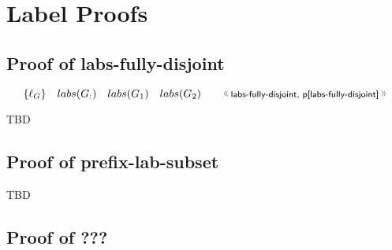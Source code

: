 \section{Label Proofs}\label{sec:label-proofs}

\subsection{Proof of labs-fully-disjoint}

\[
  \setof{\ell_G}
  \quad
  labs(G_{:})
  \quad
  labs(G_1)
  \quad
  labs(G_2)
  \qquad
  \eref{labs-fully-disjoint}
\]

TBD

\subsection{Proof of prefix-lab-subset}


TBD

\subsection{Proof of ???}
